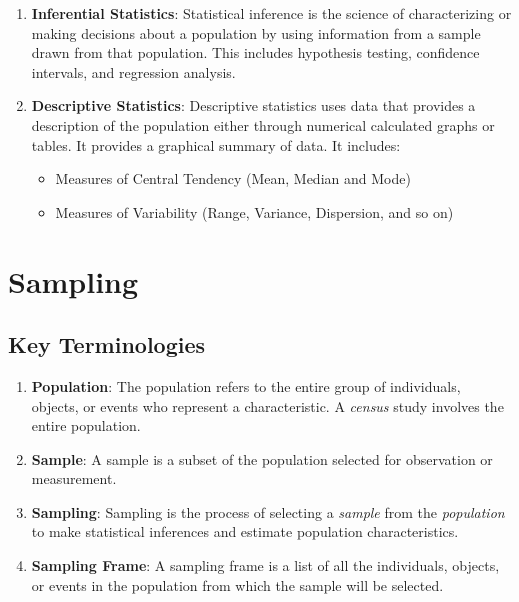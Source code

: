 \documentclass{article}
\begin{document}
        \begin{enumerate}
            \item \textbf{Inferential Statistics}: Statistical inference is the science of characterizing or making decisions about a population by using information from a sample drawn from that population. This includes hypothesis testing, confidence intervals, and regression analysis.

            \item \textbf{Descriptive Statistics}: Descriptive statistics uses data that provides a description of the population either through numerical calculated graphs or tables. It provides a graphical summary of data. It includes:
            \begin{itemize}
                \item Measures of Central Tendency (Mean, Median and Mode)
                \item Measures of Variability (Range, Variance, Dispersion, and so on)
            \end{itemize}
        \end{enumerate}

    \section{Sampling}
        \subsection{Key Terminologies}
        \begin{enumerate}
            \item \textbf{Population}: The population refers to the entire group of individuals, objects, or events who represent a characteristic. A \textit{census} study involves the entire population.

            \item \textbf{Sample}: A sample is a subset of the population selected for observation or measurement.

            \item \textbf{Sampling}: Sampling is the process of selecting a \textit{sample} from the \textit{population} to make statistical inferences and estimate population characteristics.

            \item \textbf{Sampling Frame}: A sampling frame is a list of all the individuals, objects, or events in the population from which the sample will be selected.
        \end{enumerate}
\end{document}
